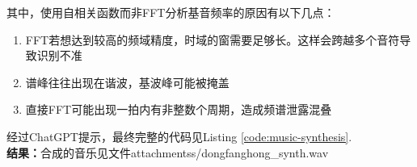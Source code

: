\documentclass[utf8]{article}
\begin{document}
\begin{enumerate}
\begin{enumerate}
        \end{enumerate}
        其中，使用自相关函数而非FFT分析基音频率的原因有以下几点：
        \begin{enumerate}
            \item FFT若想达到较高的频域精度，时域的窗需要足够长。这样会跨越多个音符导致识别不准
            \item 谱峰往往出现在谐波，基波峰可能被掩盖
            \item 直接FFT可能出现一拍内有非整数个周期，造成频谱泄露混叠
        \end{enumerate}
        经过ChatGPT提示，最终完整的代码见Listing \ref{code:music-synthesis}. \\
        \textbf{结果：}合成的音乐见文件attachmentss/dongfanghong\_synth.wav
\end{enumerate}

\newpage
\appendix

\end{document}
